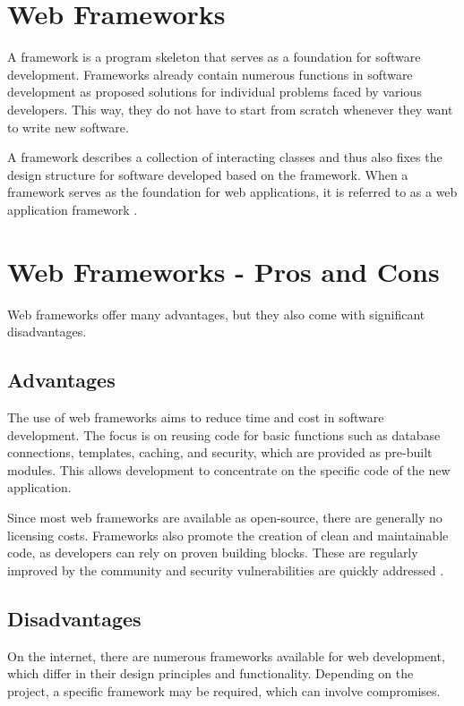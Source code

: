 \section{Web Frameworks}

A framework is a program skeleton that serves as a foundation for software development. Frameworks already contain numerous functions in software development as proposed solutions for individual problems faced by various developers. This way, they do not have to start from scratch whenever they want to write new software.

A framework describes a collection of interacting classes and thus also fixes the design structure for software developed based on the framework. When a framework serves as the foundation for web applications, it is referred to as a web application framework \cite{ionos_webframeworks}.

\section{Web Frameworks - Pros and Cons}

Web frameworks offer many advantages, but they also come with significant disadvantages.

\subsection{Advantages}

The use of web frameworks aims to reduce time and cost in software development. The focus is on reusing code for basic functions such as database connections, templates, caching, and security, which are provided as pre-built modules. This allows development to concentrate on the specific code of the new application.

Since most web frameworks are available as open-source, there are generally no licensing costs. Frameworks also promote the creation of clean and maintainable code, as developers can rely on proven building blocks. These are regularly improved by the community and security vulnerabilities are quickly addressed \cite{ionos_webframeworks}.

\subsection{Disadvantages}

On the internet, there are numerous frameworks available for web development, which differ in their design principles and functionality. Depending on the project, a specific framework may be required, which can involve compromises.

